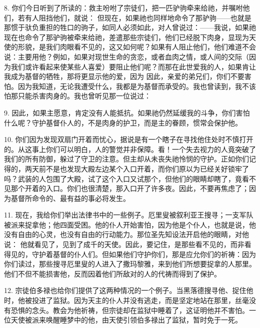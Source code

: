 8. 你们今日听到了所读的：救主吩咐了宗徒们，把一匹驴驹牵来给祂，并嘱咐他们，若有人阻挡他们，就说： 但现在，如果祂也同样地命令了那驴驹——也就是那惯于驮负重担的牲口的驹子，如同人必须如此，对人曾说过：——我说，如果祂现在也命令了那驴驹被牵来给祂，差遣那些宗徒们，他们已经脱下肉身，显现为天使的形貌，是我们肉眼看不见的，这又如何呢？如果有人阻止他们，他们难道不会说：主要用他？例如，如果对现世生命的贪恋，或者血肉之情，或人间的交际（因为我们或许看起来使某些人喜爱）要阻止他们呢？而那在此世爱我的人，如果肯让我成为基督的牺牲，那将更显示他的爱，因为 因此，亲爱的弟兄们，你们不要害怕。因为我知道，无论我遭受什么，我都是为基督而承受的。我也曾读到，我不该怕那只能杀害肉身的。我也曾听见那一位说过：\par

9. 因此，如果主愿意，肯定没有人能抵抗。如果祂仍然延缓我的斗争，你们害怕什么呢？守护基督仆人的，不是肉身的护卫，而是主的眷顾，惯常会保护他。\par

10. 你们因为发现双扇门开着而忧心，据说是有一个瞎子在寻找他住处时不慎打开的。从这事上你们可以明白，人的警觉并非保障。看！一个失去视力的人竟突破了我们的所有防御，躲过了守卫的注意。但主却从未丧失祂怜悯的守护。正如你们记得的，两天前不是也发现大殿左边某个入口开着，而你们原以为已经关好锁牢了吗？武装的人包围了大殿，试了这个入口又试那个，但他们的眼睛却瞎了，竟看不见那个开着的入口。你们也很清楚，那入口开了许多夜。因此，不要再焦虑了；因为基督所命令的、最有益的事必将发生。\par

11. 现在，我给你们举出法律书中的一些例子。厄里叟被叙利亚王搜寻；一支军队被派来捉拿他；他四面受困。他的仆人开始害怕，因为他是个仆人，也就是说，他没有自由的心灵，也没有自由的行动能力。那位圣先知设法开启他的眼睛，对他说： 他就看见了，见到了成千的天使。因此，要记住，是那些看不见的，而非看得见的，守护着基督的仆人们。但如果他们守护你们，那是应允你们的祈祷：因为你们读过，那些搜寻厄里叟的人进入了撒玛黎雅，来到他们所想要捉拿的人那里。他们不但不能损害他，反而因着他们所敌对的人的代祷而得到了保护。\par

12. 宗徒伯多禄也给你们提供了这两种情况的一个例子。当黑落德搜寻他、捉住他时，他被投进了监狱。因为天主的仆人并没有逃走，而是坚定地站在那里，丝毫没有恐惧的念头。教会为他祈祷，但宗徒却在监狱中睡着了，这证明他并不害怕。一位天使被派来唤醒睡梦中的他，由天使引领伯多禄出了监狱，暂时免于一死。\par

